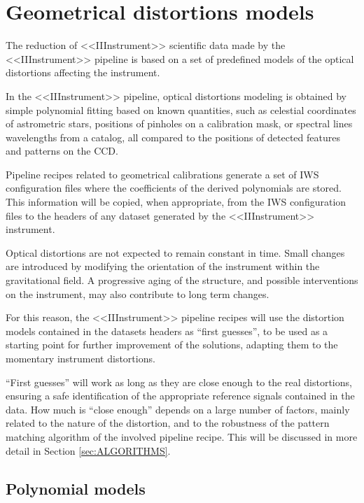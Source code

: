
\section{Geometrical distortions models}
\label{DISTORTIONS}

The reduction of <<IIInstrument>> scientific data made by the <<IIInstrument>> pipeline 
is based on a set of predefined models of the optical distortions
affecting the instrument.

In the <<IIInstrument>> pipeline, optical distortions modeling is obtained
by simple polynomial fitting based on known quantities, 
such as celestial coordinates of astrometric stars,
positions of pinholes on a calibration mask, or spectral lines
wavelengths from a catalog, all compared to the positions of detected
features and patterns on the CCD.

Pipeline recipes related to geometrical calibrations
generate a set of IWS configuration files
where the coefficients of the derived polynomials are stored.
This information will be copied, when appropriate, from the IWS configuration
files to the headers of any dataset generated by the <<IIInstrument>>
instrument.

Optical distortions are not expected to remain constant in time.
Small changes are introduced by modifying the orientation of
the instrument within the gravitational field. A progressive
aging of the structure, and possible interventions on the
instrument, may also contribute to long term changes.

For this reason, the <<IIInstrument>> pipeline recipes will use the
distortion models contained in the datasets headers as
``first guesses'', to be used as a starting point
for further improvement of the solutions, adapting them to the
momentary instrument distortions.

``First guesses'' will work as long as they are close
enough to the real distortions, ensuring a safe identification
of the appropriate reference signals contained in the data.
How much is ``close enough'' depends on a large number of
factors, mainly related to the nature of the distortion,
and to the robustness of the pattern matching algorithm of
the involved pipeline recipe. This will be discussed in more
detail in Section \ref{sec:ALGORITHMS}.

\subsection{Polynomial models}
\label{POLY}


